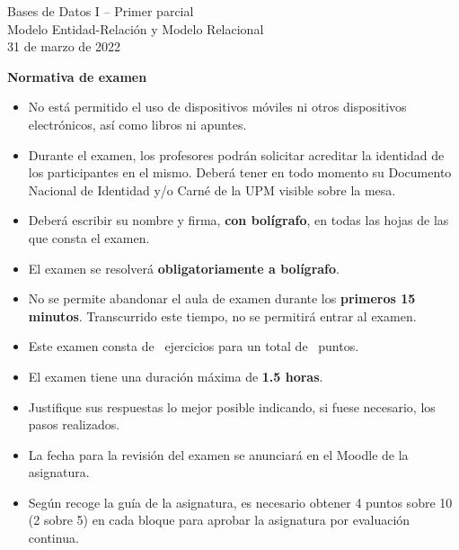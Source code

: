 \documentclass[12pt,a4paper,addpoints,answers]{exam}
\begin{document}
\begin{center}
{\Huge Bases de Datos I -- Primer parcial}\\
\vspace{2em}
{\Large Modelo Entidad-Relación y Modelo Relacional}\\
\vspace{1em}
31 de marzo de 2022
\end{center}

\begin{center}\textbf{Normativa de examen}\end{center}
\begin{itemize}
    \item No está permitido el uso de dispositivos móviles ni otros dispositivos electrónicos, así como libros ni apuntes.
    \item Durante el examen, los profesores podrán solicitar acreditar la identidad de los participantes en el mismo. Deberá tener en todo momento su Documento Nacional de Identidad y/o Carné de la UPM visible sobre la mesa.
    \item Deberá escribir su nombre y firma, \textbf{con bolígrafo}, en todas las hojas de las que consta el examen.
    \item El examen se resolverá \textbf{obligatoriamente a bolígrafo}.
    \item No se permite abandonar el aula de examen durante los \textbf{primeros 15 minutos}. Transcurrido este tiempo, no se permitirá entrar al examen.
    \item Este examen consta de \numquestions\ ejercicios para un total de \numpoints\ puntos.
    \item El examen tiene una duración máxima de \textbf{1.5 horas}.
    \item Justifique sus respuestas lo mejor posible indicando, si fuese necesario, los pasos realizados.
    \item La fecha para la revisión del examen se anunciará en el Moodle de la asignatura.
    \item Según recoge la guía de la asignatura, es necesario obtener 4 puntos sobre 10 (2 sobre 5) en cada bloque para aprobar la asignatura por evaluación continua.
\end{itemize}
\end{document}
